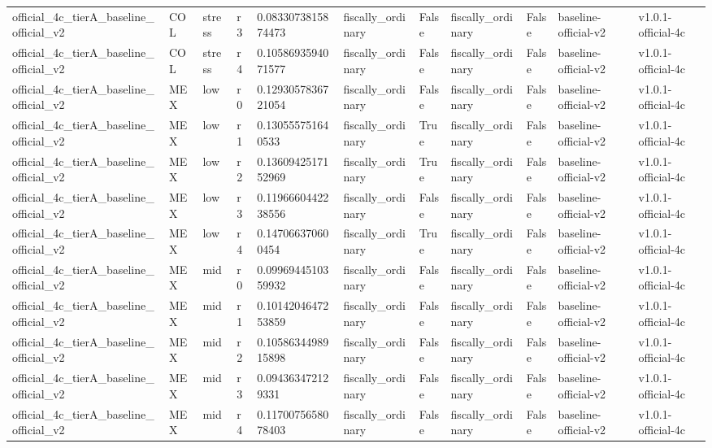 \begin{table}[!htbp]
\begin{tabular}{lllllllllll}
official\_4c\_tierA\_baseline\_official\_v2 & COL & stress & r3 & 0.0833073815874473 & fiscally\_ordinary & False & fiscally\_ordinary & False & baseline-official-v2 & v1.0.1-official-4c \\
official\_4c\_tierA\_baseline\_official\_v2 & COL & stress & r4 & 0.1058693594071577 & fiscally\_ordinary & False & fiscally\_ordinary & False & baseline-official-v2 & v1.0.1-official-4c \\
official\_4c\_tierA\_baseline\_official\_v2 & MEX & low & r0 & 0.1293057836721054 & fiscally\_ordinary & False & fiscally\_ordinary & False & baseline-official-v2 & v1.0.1-official-4c \\
official\_4c\_tierA\_baseline\_official\_v2 & MEX & low & r1 & 0.130555751640533 & fiscally\_ordinary & True & fiscally\_ordinary & False & baseline-official-v2 & v1.0.1-official-4c \\
official\_4c\_tierA\_baseline\_official\_v2 & MEX & low & r2 & 0.1360942517152969 & fiscally\_ordinary & True & fiscally\_ordinary & False & baseline-official-v2 & v1.0.1-official-4c \\
official\_4c\_tierA\_baseline\_official\_v2 & MEX & low & r3 & 0.1196660442238556 & fiscally\_ordinary & False & fiscally\_ordinary & False & baseline-official-v2 & v1.0.1-official-4c \\
official\_4c\_tierA\_baseline\_official\_v2 & MEX & low & r4 & 0.147066370600454 & fiscally\_ordinary & True & fiscally\_ordinary & False & baseline-official-v2 & v1.0.1-official-4c \\
official\_4c\_tierA\_baseline\_official\_v2 & MEX & mid & r0 & 0.0996944510359932 & fiscally\_ordinary & False & fiscally\_ordinary & False & baseline-official-v2 & v1.0.1-official-4c \\
official\_4c\_tierA\_baseline\_official\_v2 & MEX & mid & r1 & 0.1014204647253859 & fiscally\_ordinary & False & fiscally\_ordinary & False & baseline-official-v2 & v1.0.1-official-4c \\
official\_4c\_tierA\_baseline\_official\_v2 & MEX & mid & r2 & 0.1058634498915898 & fiscally\_ordinary & False & fiscally\_ordinary & False & baseline-official-v2 & v1.0.1-official-4c \\
official\_4c\_tierA\_baseline\_official\_v2 & MEX & mid & r3 & 0.094363472129331 & fiscally\_ordinary & False & fiscally\_ordinary & False & baseline-official-v2 & v1.0.1-official-4c \\
official\_4c\_tierA\_baseline\_official\_v2 & MEX & mid & r4 & 0.1170075658078403 & fiscally\_ordinary & False & fiscally\_ordinary & False & baseline-official-v2 & v1.0.1-official-4c \\

\end{tabular}
\end{table}
